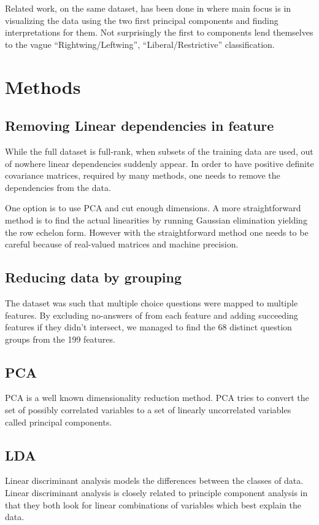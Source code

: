 \documentclass[a4paper,10pt]{article}
\begin{document}
Related work, on the same dataset, has been done in where main focus is in visualizing the data using the two first principal components and finding interpretations for them. Not surprisingly the first to components lend themselves to the vague “Rightwing/Leftwing”, “Liberal/Restrictive” classification.

\section{Methods}
\subsection{Removing Linear dependencies in feature}
While the full dataset is full-rank, when subsets of the training data are used, out of nowhere linear dependencies suddenly appear. In order to have positive definite covariance matrices, required by many methods, one needs to remove the dependencies from the data.

One option is to use PCA and cut enough dimensions. A more straightforward method is to find the actual linearities by running Gaussian elimination yielding the row echelon form. However with the straightforward method one needs to be careful because of real-valued matrices and machine precision.

\subsection{Reducing data by grouping}
The dataset was such that multiple choice questions were mapped to multiple features. By excluding no-answers of from each feature and adding succeeding features if they didn’t intersect, we managed to find the 68 distinct question groups from the 199 features.

\subsection{PCA}
PCA is a well known dimensionality reduction method. PCA tries to convert the set of possibly correlated variables to a set of linearly uncorrelated variables called principal components.

\subsection{LDA}
Linear discriminant analysis models the differences between the classes of data. Linear discriminant analysis is closely related to principle component analysis in that they both look for linear combinations of variables which best explain the data.
\end{document}
